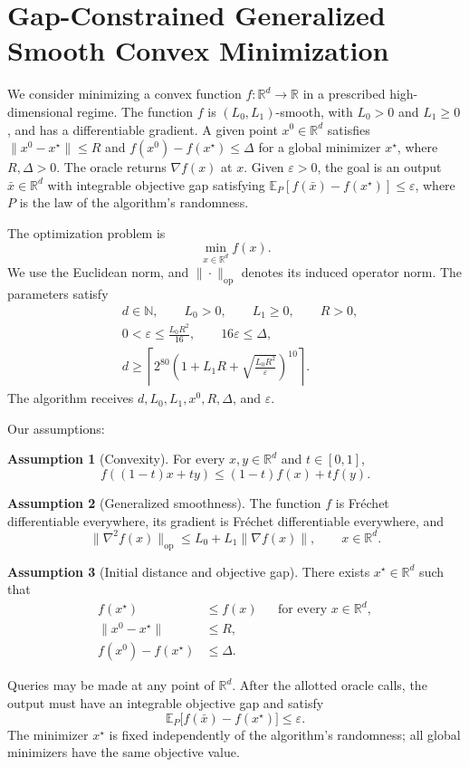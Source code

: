 \documentclass[10pt]{article}
\theoremstyle{definition}
\newtheorem{assumption}{Assumption}
\begin{document}
\section*{Gap-Constrained Generalized Smooth Convex Minimization}
We consider minimizing a convex function $f:\mathbb{R}^d\to\mathbb{R}$ in a prescribed high-dimensional regime. The function $f$ is $(L_0,L_1)$-smooth, with $L_0>0$ and $L_1\geq0$, and has a differentiable gradient. A given point $x^0\in\mathbb{R}^d$ satisfies $\|x^0-x^\star\|\leq R$ and $f(x^0)-f(x^\star)\leq\Delta$ for a global minimizer $x^\star$, where $R,\Delta>0$. The oracle returns $\nabla f(x)$ at $x$. Given $\varepsilon>0$, the goal is an output $\bar{x}\in\mathbb{R}^d$ with integrable objective gap satisfying $\mathbb{E}_P[f(\bar{x})-f(x^\star)]\leq\varepsilon$, where $P$ is the law of the algorithm's randomness.

The optimization problem is
\[
\min_{x\in\mathbb{R}^d} f(x).
\]
We use the Euclidean norm, and $\|\cdot\|_{\mathrm{op}}$ denotes its induced operator norm. The parameters satisfy
\[
\begin{aligned}
&d\in\mathbb{N},\qquad L_0>0,\qquad L_1\geq0,\qquad R>0,\\
&0<\varepsilon\leq\frac{L_0R^2}{16},\qquad 16\varepsilon\leq\Delta,\\
&d\geq\left\lceil
2^{80}\left(1+L_1R+\sqrt{\frac{L_0R^2}{\varepsilon}}\right)^{10}
\right\rceil.
\end{aligned}
\]
The algorithm receives $d,L_0,L_1,x^0,R,\Delta$, and $\varepsilon$.

Our assumptions:
\begin{assumption}[Convexity]
For every $x,y\in\mathbb{R}^d$ and $t\in[0,1]$,
\[
f((1-t)x+ty)\leq(1-t)f(x)+tf(y).
\]
\end{assumption}

\begin{assumption}[Generalized smoothness]
The function $f$ is Fr\'echet differentiable everywhere, its gradient is Fr\'echet differentiable everywhere, and
\[
\|\nabla^2 f(x)\|_{\mathrm{op}}
\leq L_0+L_1\|\nabla f(x)\|,
\qquad x\in\mathbb{R}^d.
\]
\end{assumption}

\begin{assumption}[Initial distance and objective gap]
There exists $x^\star\in\mathbb{R}^d$ such that
\[
\begin{aligned}
f(x^\star)&\leq f(x) &&\text{for every }x\in\mathbb{R}^d,\\
\|x^0-x^\star\|&\leq R,\\
f(x^0)-f(x^\star)&\leq\Delta.
\end{aligned}
\]
\end{assumption}

Queries may be made at any point of $\mathbb{R}^d$. After the allotted oracle calls, the output must have an integrable objective gap and satisfy
\[
\mathbb{E}_P\bigl[f(\bar{x})-f(x^\star)\bigr]\leq\varepsilon.
\]
The minimizer $x^\star$ is fixed independently of the algorithm's randomness; all global minimizers have the same objective value.
\end{document}
